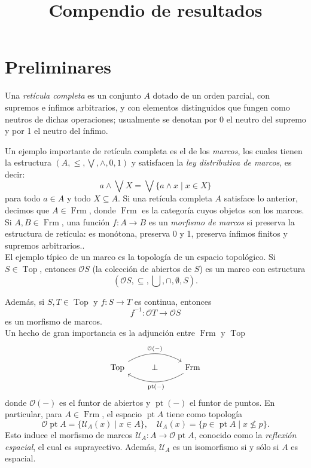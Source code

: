 \documentclass[11pt]{amsart}
\DeclareMathOperator{\pt}{pt}
\DeclareMathOperator{\Frm}{Frm}
\DeclareMathOperator{\Top}{Top}
\theoremstyle{plain}
\theoremstyle{definition}
\begin{document}

\title{Compendio de resultados}


\author{}
\email{}
\address{}


\address{}



\maketitle
\tableofcontents
\section{Preliminares}
Una \emph{retícula completa} es un conjunto $A$ dotado de un orden parcial, con supremos e ínfimos arbitrarios,
y con elementos distinguidos que fungen como neutros de dichas operaciones; usualmente se denotan por 0
el neutro del supremo y por 1 el neutro del ínfimo.

Un ejemplo importante de retícula completa es el de los \emph{marcos}, los cuales tienen la estructura $(A, \leq, \bigvee, \wedge, 0, 1)$ y
satisfacen la \emph{ley distributiva de marcos}, es decir: 
\[
a\wedge\bigvee X=\bigvee\{a\wedge x\mid x\in X\}
\]
para todo $a\in A$ y todo $X\subseteq A$. Si una retícula completa $A$ satisface lo anterior, decimos que $A\in \Frm$, donde $\Frm$ es la categoría 
cuyos objetos son los marcos.\\

Si $A, B\in \Frm$, una función $f\colon A\to B$ es un \emph{morfismo de marcos} si preserva la estructura de retícula: es monótona,
preserva 0 y 1, preserva ínfimos finitos y supremos arbitrarios..\\

El ejemplo típico de un marco es la topología de un espacio topológico. Si $S\in \Top$, entonces $\mathcal{O}S$ (la colección de abiertos de $S$) 
es un marco con estructura 
\[
(\mathcal{O}S, \subseteq, \bigcup, \cap, \emptyset, S).
\]

Además, si $S, T\in \Top$ y $f\colon S\to T$ es continua, entonces
\[
f^{-1}\colon \mathcal{O}T\to \mathcal{O}S
\] 
es un morfismo de marcos.\\

Un hecho de gran importancia es la adjunción entre $\Frm$ y $\Top$
\[\begin{tikzcd}
\Top \arrow[rr, "\mathcal{O}(-)", bend left] & \perp & \Frm \arrow[ll, "\pt(-)", bend left]
\end{tikzcd}
\]
donde $\mathcal{O}(-)$ es el funtor de abiertos y $\pt(-)$ el funtor de puntos. En particular, para $A\in \Frm$, el espacio $\pt A$ tiene como topología
\[
\mathcal{O}\pt A=\{\mathcal{U}_A(x)\mid x\in A\},\quad \mathcal{U}_A(x)=\{p\in \pt A\mid x\nleq p\}.
\]
Esto induce el morfismo de marcos $\mathcal{U}_A\colon A\to \mathcal{O}\pt A$, conocido como la \emph{reflexión espacial},
el cual es suprayectivo. Además, $\mathcal{U}_A$ es un isomorfismo si y sólo si $A$ es espacial.\\
\end{document}
